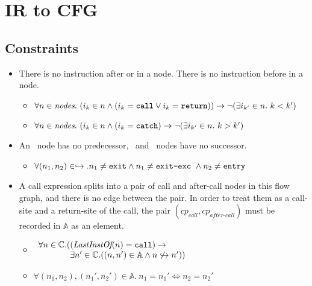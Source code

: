 \chapter{IR to CFG}
\section{Constraints}
\begin{itemize}
\item There is no instruction after  or  in a node. There is no instruction before  in a node.
    \begin{itemize}
    \item $\forall n \in \emph{nodes}.\ (i_k\in n \wedge (i_k = \mbox{\texttt{call}} \vee i_k =\mbox{\texttt{return}}))\rightarrow \neg(\exists i_{k'} \in n.\ k<k')$
    \item $\forall n \in \emph{nodes}.\ (i_k\in n \wedge (i_k =\TT{catch})\rightarrow \neg(\exists i_{k'} \in n.\ k>k')$
    \end{itemize}
\item An \Entry\ node has no predecessor, \Exit\ and \Exite\ nodes have no successor.
    \begin{itemize}
    \item $\forall (n_1,n_2)\in \hookrightarrow. n_1 \neq \mbox{\texttt{exit}} \wedge n_1 \neq \mbox{\texttt{exit-exc}}~ \wedge  n_2 \neq \mbox{\texttt{entry}} $

    \end{itemize}

\item A call expression splits into a pair of call and after-call nodes in this flow graph, and there is no edge between the pair. In order to treat them as a call-site and a return-site of the call, the pair $(cp_{\textit{call}},cp_{\textit{after-call}})$ must be recorded in $\mathbb{A}$ as an element.
   \begin{itemize}
	\item $
\begin{array}{ll}
\forall n \in \controlpoint.( (\emph{LastInstOf}(n) = \TT{call}) \rightarrow\\
\phantom{\forall n \in \controlpoint.(}
 \exists n' \in \controlpoint.((n,n')\in \mathbb{A} \wedge n\not\cfgnext n'))
\end{array}
$

	\item $\forall(n_1,n_2),(n_1',n_2')\in \mathbb{A}. \ n_1 = n_1' \Leftrightarrow n_2 = n_2' $
    \end{itemize}
\end{itemize}


